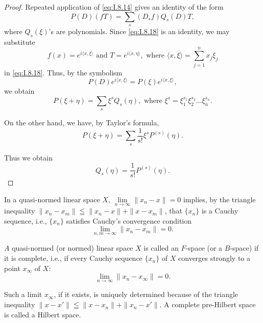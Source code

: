 \begin{proof}
 Repeated application of \eqref{eq:I.8.14} gives an identity of the form 
 \begin{equation}\label{eq:I.8.18}
 P(D) (f T) = \sum\limits_{s} \left(D_{s} f\right) Q_{s} (D) T,
 \end{equation}
where $Q_{s}(\xi)$'s are polynomials. Since \eqref{eq:I.8.18} is an identity, we may substitute 
\[
f (x) = e ^{i \langle x, \xi \rangle} \text{ and } T = e ^{i \langle x, \eta \rangle}, \text{ where } \langle x, \xi \rangle = \sum\limits_{j=1} ^{n} x_{j} \xi_{j}
\]
in \eqref{eq:I.8.18}. Thus, by the symbolism 
\begin{equation}\label{eq:I.8.19}
P(D) e ^{i \langle x, \xi \rangle} = P(\xi) e ^{i \langle x, \xi \rangle},
\end{equation}
we obtain 
\[
P(\xi + \eta) = \sum\limits_{s} \xi^{s} Q_{s} (\eta), \text{ where } \xi^{s} = \xi_{1} ^ {s_{1}} \xi_{2} ^ {s_{2}} \dots \xi_{n} ^ {s_{n}}.
\]

On the other hand, we have, by Taylor's formula, 
\[
P(\xi + \eta) = \sum\limits_{s} \frac {1}{s !} \xi^{s} P^{(s)} (\eta).
\]

 Thus we obtain 
 \[
 Q_{s} (\eta) = \frac {1}{s !} P^{(s)} (\eta).
 \]
\end{proof}

\label{sec:I.9}

In a quasi-normed linear space $X$, $\lim\limits_{n\to \infty}\|x_n- x\| = 0$ implies, by the triangle inequality $\|x_n- x_m\|\leqq \|x_n- x\| + \|x- x_m\|$, that $\{x_n\}$ is a Cauchy sequence, i.e., $\{x_n\}$ satisfies Cauchy's convergence condition 
\begin{equation}\label{eq:I.9.1}
\lim\limits_{n, m \rightarrow \infty} \| x_{n}- x_{m} \| = 0.
\end{equation}

\begin{definition}\label{def:I.9.Definition.1} $A$ quasi-normed (or normed) linear space $X$ is called an $F$-space (or a $B$-space) if it is complete, i.e., if every Cauchy sequence $\{x_{n}\}$ of $X$ converges strongly to a point $x_{\infty}$ of $X$: 
\begin{equation}\label{eq:I.9.2}
\lim\limits_{n \rightarrow \infty} \| x_{n}- x_{\infty} \| = 0.
\end{equation}
\end{definition}

Such a limit $x_{\infty}$, if it exists, is uniquely determined because of the triangle inequality $\|x- x' \| \leqq \|x- x_n\| + \|x_n- x'\|$. A complete pre-Hilbert space is called a Hilbert space. 

